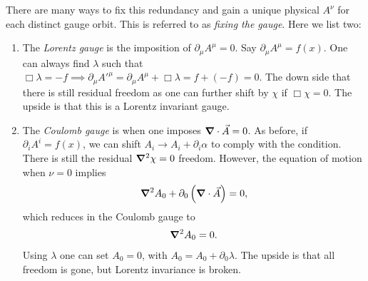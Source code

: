 There are many ways to fix this redundancy and gain a unique physical $A^{\nu}$ for each distinct gauge orbit. This is referred to as \textit{fixing the gauge}. Here we list two:
\begin{enumerate}[label=\arabic*)]
    \item The \textit{Lorentz gauge} is the imposition of $\partial_\mu A^{\mu} = 0$. Say $\partial_\mu A^{\mu} = f \left( x \right)$. One can always find $\lambda$ such that $\Box \lambda = -f \implies \partial_\mu A'^{\mu} = \partial_\mu A^{\mu} + \Box \lambda = f + \left( -f \right) = 0$. The down side that there is still residual freedom as one can further shift by $\chi$ if $\Box \chi = 0$. The upside is that this is a Lorentz invariant gauge.
    \item The \textit{Coulomb gauge} is when one imposes $\grad \cdot \vec{A} = 0$. As before, if $\partial_i A^{i} = f\left( x \right)$, we can shift $A_{i} \to A_{i} + \partial_i \alpha$ to comply with the condition. There is still the residual $\grad^2 \chi = 0$ freedom. However, the equation of motion when $\nu = 0$ implies
        \begin{align}
            \grad^2 A_0 + \partial_0 \left( \grad \cdot \vec{A} \right) = 0
        ,\end{align}
        which reduces in the Coulomb gauge to
        \begin{align}
            \grad^2 A_0 = 0
        .\end{align}
        Using $\lambda$ one can set $A_0 = 0$, with $A_0 = A_0 + \partial_0 \lambda$. The upside is that all freedom is gone, but Lorentz invariance is broken.
\end{enumerate}
